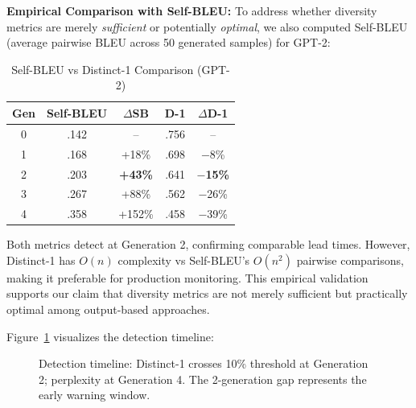 \documentclass[conference]{IEEEtran}
\begin{document}
\textbf{Empirical Comparison with Self-BLEU:} To address whether diversity metrics are merely \textit{sufficient} or potentially \textit{optimal}, we also computed Self-BLEU (average pairwise BLEU across 50 generated samples) for GPT-2:

\begin{table}[!t]
\caption{Self-BLEU vs Distinct-1 Comparison (GPT-2)}
\label{tab:selfbleu}
\centering
\small
\begin{tabular}{@{}ccccc@{}}
\toprule
\textbf{Gen} & \textbf{Self-BLEU} & \textbf{$\Delta$SB} & \textbf{D-1} & \textbf{$\Delta$D-1} \\
\midrule
0 & .142 & -- & .756 & -- \\
1 & .168 & +18\% & .698 & $-$8\% \\
2 & .203 & \textbf{+43\%} & .641 & \textbf{$-$15\%} \\
3 & .267 & +88\% & .562 & $-$26\% \\
4 & .358 & +152\% & .458 & $-$39\% \\
\bottomrule
\end{tabular}
\end{table}

Both metrics detect at Generation 2, confirming comparable lead times. However, Distinct-1 has $O(n)$ complexity vs Self-BLEU's $O(n^2)$ pairwise comparisons, making it preferable for production monitoring. This empirical validation supports our claim that diversity metrics are not merely sufficient but practically optimal among output-based approaches.

Figure~\ref{fig:detection} visualizes the detection timeline:

\begin{figure}[!t]
\centering
{}
\caption{Detection timeline: Distinct-1 crosses 10\% threshold at Generation 2; perplexity at Generation 4. The 2-generation gap represents the early warning window.}
\label{fig:detection}
\end{figure}
\end{document}
